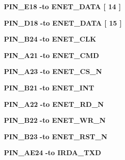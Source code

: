 \begin{DoxyCompactItemize}
{\bf P\+I\+N\+\_\+\+E18} {\bfseries \textcolor{vhdlchar}{-\/}\textcolor{keywordflow}{to}\textcolor{vhdlchar}{ }\textcolor{vhdlchar}{E\+N\+E\+T\+\_\+\+D\+A\+TA}\textcolor{vhdlchar}{ }\textcolor{vhdlchar}{[}\textcolor{vhdlchar}{ } \textcolor{vhdldigit}{14} \textcolor{vhdlchar}{ }\textcolor{vhdlchar}{]}\textcolor{vhdlchar}{ }} 
\item 
{\bf P\+I\+N\+\_\+\+D18} {\bfseries \textcolor{vhdlchar}{-\/}\textcolor{keywordflow}{to}\textcolor{vhdlchar}{ }\textcolor{vhdlchar}{E\+N\+E\+T\+\_\+\+D\+A\+TA}\textcolor{vhdlchar}{ }\textcolor{vhdlchar}{[}\textcolor{vhdlchar}{ } \textcolor{vhdldigit}{15} \textcolor{vhdlchar}{ }\textcolor{vhdlchar}{]}\textcolor{vhdlchar}{ }} 
\item 
{\bf P\+I\+N\+\_\+\+B24} {\bfseries \textcolor{vhdlchar}{-\/}\textcolor{keywordflow}{to}\textcolor{vhdlchar}{ }\textcolor{vhdlchar}{E\+N\+E\+T\+\_\+\+C\+LK}\textcolor{vhdlchar}{ }} 
\item 
{\bf P\+I\+N\+\_\+\+A21} {\bfseries \textcolor{vhdlchar}{-\/}\textcolor{keywordflow}{to}\textcolor{vhdlchar}{ }\textcolor{vhdlchar}{E\+N\+E\+T\+\_\+\+C\+MD}\textcolor{vhdlchar}{ }} 
\item 
{\bf P\+I\+N\+\_\+\+A23} {\bfseries \textcolor{vhdlchar}{-\/}\textcolor{keywordflow}{to}\textcolor{vhdlchar}{ }\textcolor{vhdlchar}{E\+N\+E\+T\+\_\+\+C\+S\+\_\+N}\textcolor{vhdlchar}{ }} 
\item 
{\bf P\+I\+N\+\_\+\+B21} {\bfseries \textcolor{vhdlchar}{-\/}\textcolor{keywordflow}{to}\textcolor{vhdlchar}{ }\textcolor{vhdlchar}{E\+N\+E\+T\+\_\+\+I\+NT}\textcolor{vhdlchar}{ }} 
\item 
{\bf P\+I\+N\+\_\+\+A22} {\bfseries \textcolor{vhdlchar}{-\/}\textcolor{keywordflow}{to}\textcolor{vhdlchar}{ }\textcolor{vhdlchar}{E\+N\+E\+T\+\_\+\+R\+D\+\_\+N}\textcolor{vhdlchar}{ }} 
\item 
{\bf P\+I\+N\+\_\+\+B22} {\bfseries \textcolor{vhdlchar}{-\/}\textcolor{keywordflow}{to}\textcolor{vhdlchar}{ }\textcolor{vhdlchar}{E\+N\+E\+T\+\_\+\+W\+R\+\_\+N}\textcolor{vhdlchar}{ }} 
\item 
{\bf P\+I\+N\+\_\+\+B23} {\bfseries \textcolor{vhdlchar}{-\/}\textcolor{keywordflow}{to}\textcolor{vhdlchar}{ }\textcolor{vhdlchar}{E\+N\+E\+T\+\_\+\+R\+S\+T\+\_\+N}\textcolor{vhdlchar}{ }} 
\item 
{\bf P\+I\+N\+\_\+\+A\+E24} {\bfseries \textcolor{vhdlchar}{-\/}\textcolor{keywordflow}{to}\textcolor{vhdlchar}{ }\textcolor{vhdlchar}{I\+R\+D\+A\+\_\+\+T\+XD}\textcolor{vhdlchar}{ }} 
\item 

\end{DoxyCompactItemize}
